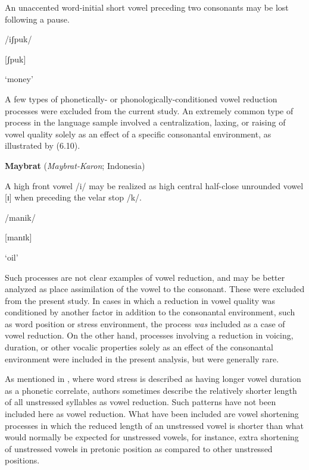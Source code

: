 An unaccented word-initial short vowel preceding two consonants may be lost following a pause. 



/iʃpuk/



[ʃpuk]



‘money’



\citep[53]{Bright1957}

\z


  A few types of phonetically- or phonologically-conditioned vowel reduction processes were excluded from the current study. An extremely common type of process in the language sample involved a centralization, laxing, or raising of vowel quality solely as an effect of a specific consonantal environment, as illustrated by (6.10).



\ea\label{ex:(6.10)}
   \textbf{Maybrat} (\textit{Maybrat-Karon}; Indonesia)



A high front vowel /i/ may be realized as high central half-close unrounded vowel [ɪ] when preceding the velar stop /k/.



/manik/



[manɪk]



‘oil’



\citep[15]{Dol2007}

\z


Such processes are not clear examples of vowel reduction, and may be better analyzed as place assimilation of the vowel to the consonant. These were excluded from the present study. In cases in which a reduction in vowel quality was conditioned by another factor in addition to the consonantal environment, such as word position or stress environment, the process \textit{was} included as a case of vowel reduction. On the other hand, processes involving a reduction in voicing, duration, or other vocalic properties solely as an effect of the consonantal environment were included in the present analysis, but were generally rare.



  As mentioned in , where word stress is described as having longer vowel duration as a phonetic correlate, authors sometimes describe the relatively shorter length of all unstressed syllables as vowel reduction. Such patterns have not been included here as vowel reduction. What have been included are vowel shortening processes in which the reduced length of an unstressed vowel is shorter than what would normally be expected for unstressed vowels, for instance, extra shortening of unstressed vowels in pretonic position as compared to other unstressed positions.



